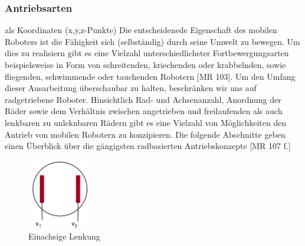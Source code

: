 \subsubsection{Antriebsarten}als Koordinaten (x,y,z-Punkte)
\color{process}
Die entscheidenede Eigenschaft des mobilen Roboters ist die Fähigkeit sich (selbständig) durch seine Umwelt zu bewegen. Um dies zu realisiern gibt es eine Vielzahl unterschiedlichster Fortbewergungsarten beispielsweise in Form von schreitenden, kriechenden oder krabbelnden, sowie fliegenden, schwimmende oder tauchenden Robotern [MR 103].
\newline
Um den Umfang dieser Ausarbeitung überschaubar zu halten, beschränken wir uns auf radgetriebene Roboter.
\newline
Hinsichtlich Rad- und Achsenanzahl, Anordnung der Räder sowie dem Verhältnis zwischen angetrieben und freilaufenden als auch lenkbaren zu unleknbaren Rädern gibt es eine Vielzahl von Möglichkeiten den Antrieb von mobilen Robotern zu konzipieren. Die folgende Abschnitte geben einen Überblick über die gängigsten radbasierten Antriebskonzepte [MR 107 f.]
\begin{figure}
	\vspace{+0.5cm}
	\begin{center}
		\includegraphics[width=0.25\textwidth]{images/technische_grundlagen/Differentialantrieb.png}
	\end{center}
	\caption{Einachsige Lenkung}
	\label{fig:einachsenlenkung}
\end{figure}

